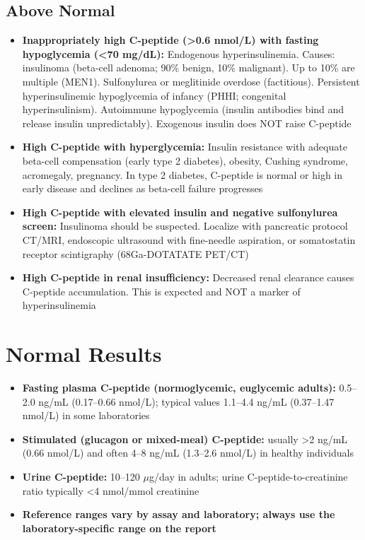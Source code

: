 \subsection*{Above Normal}
\begin{itemize}
  \item \textbf{Inappropriately high C-peptide (>0.6 nmol/L) with fasting hypoglycemia (<70 mg/dL):} Endogenous hyperinsulinemia. Causes: insulinoma (beta-cell adenoma; 90\% benign, 10\% malignant). Up to 10\% are multiple (MEN1). Sulfonylurea or meglitinide overdose (factitious). Persistent hyperinsulinemic hypoglycemia of infancy (PHHI; congenital hyperinsulinism). Autoimmune hypoglycemia (insulin antibodies bind and release insulin unpredictably). Exogenous insulin does NOT raise C-peptide
  \item \textbf{High C-peptide with hyperglycemia:} Insulin resistance with adequate beta-cell compensation (early type 2 diabetes), obesity, Cushing syndrome, acromegaly, pregnancy. In type 2 diabetes, C-peptide is normal or high in early disease and declines as beta-cell failure progresses
  \item \textbf{High C-peptide with elevated insulin and negative sulfonylurea screen:} Insulinoma should be suspected. Localize with pancreatic protocol CT/MRI, endoscopic ultrasound with fine-needle aspiration, or somatostatin receptor scintigraphy (68Ga-DOTATATE PET/CT)
  \item \textbf{High C-peptide in renal insufficiency:} Decreased renal clearance causes C-peptide accumulation. This is expected and NOT a marker of hyperinsulinemia
\end{itemize}

\section*{Normal Results}
\begin{itemize}
  \item \textbf{Fasting plasma C-peptide (normoglycemic, euglycemic adults):} 0.5--2.0 ng/mL (0.17--0.66 nmol/L); typical values 1.1--4.4 ng/mL (0.37--1.47 nmol/L) in some laboratories
  \item \textbf{Stimulated (glucagon or mixed-meal) C-peptide:} usually >2 ng/mL (0.66 nmol/L) and often 4--8 ng/mL (1.3--2.6 nmol/L) in healthy individuals
  \item \textbf{Urine C-peptide:} 10--120 $\mu$g/day in adults; urine C-peptide-to-creatinine ratio typically <4 nmol/mmol creatinine
  \item \textbf{Reference ranges vary by assay and laboratory; always use the laboratory-specific range on the report}
\end{itemize}

